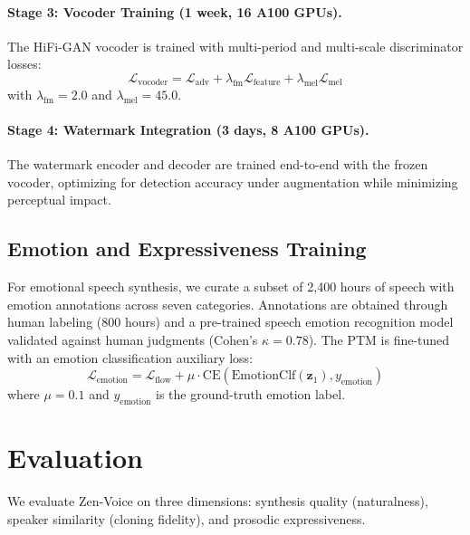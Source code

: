 \documentclass[11pt,a4paper]{article}
\begin{document}
\paragraph{Stage 3: Vocoder Training (1 week, 16 A100 GPUs).} The HiFi-GAN vocoder is trained with multi-period and multi-scale discriminator losses:
\begin{equation}
    \mathcal{L}_{\text{vocoder}} = \mathcal{L}_{\text{adv}} + \lambda_{\text{fm}} \mathcal{L}_{\text{feature}} + \lambda_{\text{mel}} \mathcal{L}_{\text{mel}}
\end{equation}
with $\lambda_{\text{fm}} = 2.0$ and $\lambda_{\text{mel}} = 45.0$.

\paragraph{Stage 4: Watermark Integration (3 days, 8 A100 GPUs).} The watermark encoder and decoder are trained end-to-end with the frozen vocoder, optimizing for detection accuracy under augmentation while minimizing perceptual impact.

\subsection{Emotion and Expressiveness Training}

For emotional speech synthesis, we curate a subset of 2,400 hours of speech with emotion annotations across seven categories. Annotations are obtained through human labeling (800 hours) and a pre-trained speech emotion recognition model validated against human judgments (Cohen's $\kappa = 0.78$). The PTM is fine-tuned with an emotion classification auxiliary loss:
\begin{equation}
    \mathcal{L}_{\text{emotion}} = \mathcal{L}_{\text{flow}} + \mu \cdot \text{CE}(\text{EmotionClf}(\bm{z}_1), y_{\text{emotion}})
\end{equation}
where $\mu = 0.1$ and $y_{\text{emotion}}$ is the ground-truth emotion label.

\section{Evaluation}
\label{sec:evaluation}

We evaluate Zen-Voice on three dimensions: synthesis quality (naturalness), speaker similarity (cloning fidelity), and prosodic expressiveness.
\end{document}
